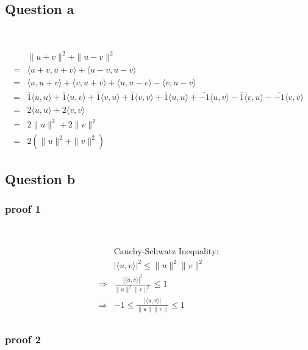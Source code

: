 \documentclass{article}
\begin{document}
\subsection{Question a}

~

\begin{equation*}
    \begin{split}
        &\| u+v\|^2+\| u-v\|^2\\
        =&\langle u+v,u+v\rangle +\langle u-v,u-v\rangle\\
        =&\langle u,u+v\rangle+\langle v,u+v\rangle+\langle u,u-v\rangle-\langle v,u-v\rangle\\
        =&\overline{1}\langle u,u\rangle+\overline{1}\langle u,v\rangle+\overline{1}\langle v,u\rangle+\overline{1}\langle v,v\rangle+\overline{1}\langle u,u\rangle+\overline{-1}\langle u,v\rangle-\overline{1}\langle v,u\rangle-\overline{-1}\langle v,v\rangle\\
        =&2\langle u,u\rangle+2\langle v,v\rangle\\
        =&2\|u\|^2+2\|v\|^2\\
        =&2(\|u\|^2+\|v\|^2)
    \end{split}
\end{equation*}

\subsection{Question b}

\subsubsection{proof 1}

~

\begin{equation*}
    \begin{split}
        &\text{Cauchy-Schwatz Inequality}:\\
        &|\langle u,v\rangle|^2\leq\|u\|^2\|v\|^2\\
        \Rightarrow&\frac{|\langle u,v\rangle|^2}{\|u\|^2\|v\|^2}\leq1\\
        \Rightarrow&-1\leq\frac{|\langle u,v\rangle|}{\|u\|\|v\|}\leq1\\
    \end{split}
\end{equation*}

\subsubsection{proof 2}
\end{document}
